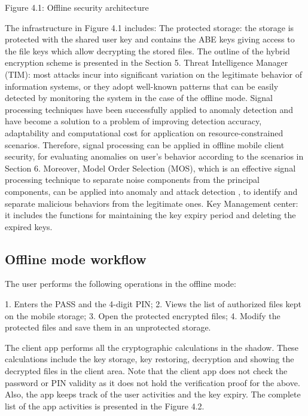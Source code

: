 \documentclass[twocolumn]{svjour3}          %
\begin{document}
Figure 4.1: Offline security architecture

The infrastructure in Figure 4.1 includes:
The protected storage: the storage is protected with the shared user key and contains the ABE keys giving access to the file keys which allow decrypting the stored files. The outline of the hybrid encryption scheme is presented in the Section 5.
Threat Intelligence Manager (TIM): most attacks incur into significant variation on the legitimate behavior of information systems, or they adopt well-known patterns that can be easily detected by monitoring the system in the case of the offline mode. Signal processing techniques have been successfully applied to anomaly detection \cite{lu2009network, huang2009signal} and have become a solution to a problem of improving detection accuracy, adaptability and computational cost for application on resource-constrained scenarios. Therefore, signal processing can be applied in offline mobile client security, for evaluating anomalies on user's behavior according to the scenarios in Section 6. Moreover, Model Order Selection (MOS), which is an effective signal processing technique to separate noise components from the principal components, can be applied into anomaly and attack detection \cite{tenorio2013greatest}, to identify and separate malicious behaviors from the legitimate ones.
Key Management center: it includes the functions for maintaining the key expiry period and deleting the expired keys. 

\subsection{Offline mode workflow}
\label{sec_offline_mode_workflow}
The user performs the following operations in the offline mode:

1. Enters the PASS and the 4-digit PIN;
2. Views the list of authorized files kept on the mobile storage;
3. Open the protected encrypted files;
4. Modify the protected files and save them in an unprotected storage.

The client app performs all the cryptographic calculations in the shadow. These calculations include the key storage, key restoring, decryption and showing the decrypted files in the client area. Note that the client app does not check the password or PIN validity as it does not hold the verification proof for the above. Also, the app keeps track of the user activities and the key expiry. The complete list of the app activities is presented in the Figure 4.2.
\end{document}
